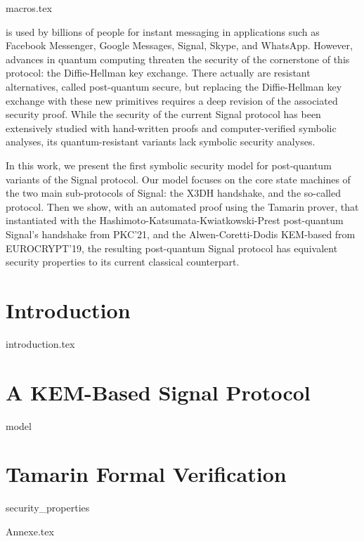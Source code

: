 {

\newcommand{\vs}[1]{\vspace*{-#1mm}}

{macros.tex}

 \label{cha:PQSignal}


 is used by billions of people for instant 
messaging in applications such as Facebook Messenger, Google Messages, Signal, 
Skype, and WhatsApp. However, advances in quantum computing threaten the 
security of the cornerstone of this protocol: the Diffie-Hellman key exchange. 
There actually are resistant alternatives, called post-quantum secure, but 
replacing the Diffie-Hellman key exchange with these new primitives requires a 
deep revision of the associated security proof. While the security of the 
current Signal protocol has been extensively studied with hand-written proofs 
and computer-verified symbolic analyses, its quantum-resistant variants lack 
symbolic security analyses.

In this work, we present the first symbolic security model for post-quantum 
variants of the Signal protocol. Our model focuses on the core state machines
of the two main sub-protocols of Signal: the X3DH handshake, and the so-called
\emph{\dr} protocol. Then we show, with an automated proof using the Tamarin
prover, that instantiated with the Hashimoto-Katsumata-Kwiatkowski-Prest
post-quantum Signal's handshake from PKC'21, and the Alwen-Coretti-Dodis
KEM-based \dr from EUROCRYPT'19, the resulting post-quantum Signal protocol
has equivalent security properties to its current classical count\-er\-part.

\section{Introduction}\label{PQSignal:sec:introduction}
{introduction.tex}

\section{A KEM-Based Signal Protocol}
\label{sec:pqsignal}
{model}

%

\section{Tamarin Formal Verification}
\label{sec:verif}
{security_properties}

{Annexe.tex}

}
